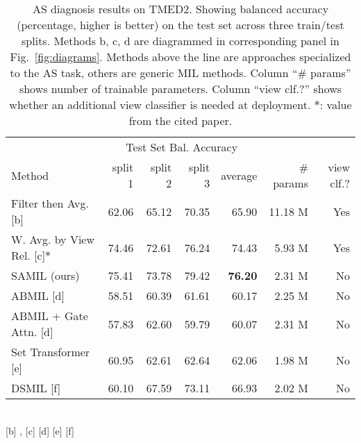 \begin{table}[!t]
    \begin{tabular}{l|rrr| r | r r}
	    & \multicolumn{4}{c}{Test Set Bal. Accuracy} & & \\
     Method & split 1 & split 2 & split 3 & average & \# params & view clf.?\\
    \hline
    Filter then Avg. [b] & 62.06 & 65.12 & 70.35 & 65.90 & 11.18 M & Yes
    \\
    W. Avg. by View Rel. [c]$*$
    & 74.46 & 72.61 & 76.24 & 74.43 &  5.93 M & Yes
    \\
    SAMIL (ours)            & 75.41 & 73.78 & 79.42 & \textbf{76.20}& 2.31 M & No
    \\
    \hline
    ABMIL [d]                 & 58.51 & 60.39 & 61.61 & 60.17 & 2.25 M & No\\
    ABMIL + Gate Attn. [d]  & 57.83 & 62.60 & 59.79 & 60.07 & 2.31 M & No \\
    Set Transformer [e]  & 60.95 & 62.61 & 62.64 & 62.06&  1.98 M & No \\
    DSMIL [f]  & 60.10 & 67.59 & 73.11 & 66.93&  2.02 M & No \\
    \end{tabular}
    \\
     {\footnotesize [b] \citet{holste2022automated}, [c] \citet{wessler2023automated} 
     [d] \citet{ilse2018attention} [e] \citet{lee2019set} [f] \citet{li2021dual} 
    }%
    \caption{AS diagnosis results on TMED2. Showing balanced accuracy (percentage, higher is better) on the test set across three train/test splits. Methods b, c, d are diagrammed in corresponding panel in Fig.~\ref{fig:diagrams}.
    Methods above the line are approaches specialized to the AS task, others are generic MIL methods. Column ``\# params'' shows number of trainable parameters. Column ``view clf.?'' shows whether an additional view classifier is needed at deployment. $*$: value from the cited paper.
    }%
    \label{tab:TMED2_BACC}
\end{table}